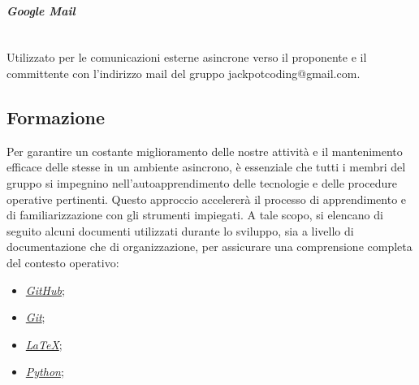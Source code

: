 \documentclass[5pt]{article}
\begin{document}
\paragraph{\textit{Google Mail}}~\\
Utilizzato per le comunicazioni esterne asincrone verso il proponente e il committente con l'indirizzo mail del gruppo jackpotcoding@gmail.com.

\subsection{Formazione}
Per garantire un costante miglioramento delle nostre attività e il mantenimento efficace delle stesse in un ambiente asincrono, è essenziale che tutti i membri del gruppo si impegnino nell'autoapprendimento delle tecnologie e delle procedure operative pertinenti. Questo approccio accelererà il processo di apprendimento e di familiarizzazione con gli strumenti impiegati. A tale scopo, si elencano di seguito alcuni documenti utilizzati durante lo sviluppo, sia a livello di documentazione che di organizzazione, per assicurare una comprensione completa del contesto operativo:

\begin{itemize} 
    \item \href{https://docs.github.com/en}{\textit{GitHub}};
    \item \href{https://docs.github.com/en/get-started/using-git/pushing-commits-to-a-remote-repository}{\textit{Git}};
    \item \href{https://www.overleaf.com/learn/latex/Learn_LaTeX_in_30_minutes}{\textit{LaTeX}};
    \item \href{https://docs.python.org/3/tutorial/index.html}{\textit{Python}};
\end{itemize}
\end{document}
